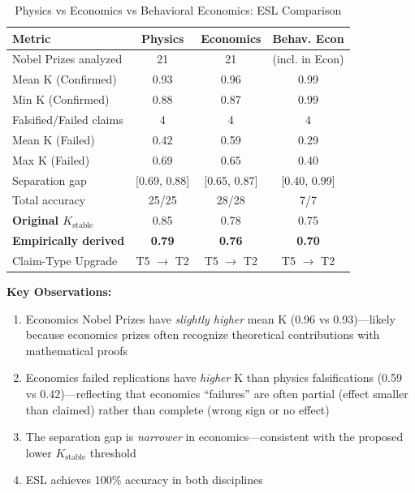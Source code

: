 \documentclass[11pt,a4paper]{article}
\begin{document}
\begin{table}[h]
\centering
\caption{Physics vs Economics vs Behavioral Economics: ESL Comparison}
\begin{tabular}{lccc}
\toprule
\textbf{Metric} & \textbf{Physics} & \textbf{Economics} & \textbf{Behav. Econ} \\
\midrule
Nobel Prizes analyzed & 21 & 21 & (incl. in Econ) \\
Mean K (Confirmed) & 0.93 & 0.96 & 0.99 \\
Min K (Confirmed) & 0.88 & 0.87 & 0.99 \\
\midrule
Falsified/Failed claims & 4 & 4 & 4 \\
Mean K (Failed) & 0.42 & 0.59 & 0.29 \\
Max K (Failed) & 0.69 & 0.65 & 0.40 \\
\midrule
Separation gap & [0.69, 0.88] & [0.65, 0.87] & [0.40, 0.99] \\
Total accuracy & 25/25 & 28/28 & 7/7 \\
\midrule
\textbf{Original $K_{\text{stable}}$} & 0.85 & 0.78 & 0.75 \\
\textbf{Empirically derived} & \textbf{0.79} & \textbf{0.76} & \textbf{0.70} \\
Claim-Type Upgrade & T5 $\to$ T2 & T5 $\to$ T2 & T5 $\to$ T2 \\
\bottomrule
\end{tabular}
\end{table}

\textbf{Key Observations:}
\begin{enumerate}
    \item Economics Nobel Prizes have \textit{slightly higher} mean K (0.96 vs 0.93)---likely because economics prizes often recognize theoretical contributions with mathematical proofs
    \item Economics failed replications have \textit{higher} K than physics falsifications (0.59 vs 0.42)---reflecting that economics ``failures'' are often partial (effect smaller than claimed) rather than complete (wrong sign or no effect)
    \item The separation gap is \textit{narrower} in economics---consistent with the proposed lower $K_{\text{stable}}$ threshold
    \item ESL achieves 100\% accuracy in both disciplines
\end{enumerate}

\end{document}
